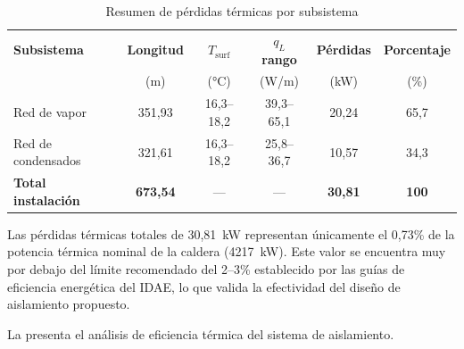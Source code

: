 \begin{table}[H]
	\centering
	\caption{Resumen de pérdidas térmicas por subsistema}
	\label{tab:conclusiones-perdidas-termicas}
	\begin{tabular}{lccccc}
		\toprule
		\textbf{Subsistema}        & \textbf{Longitud} & \textbf{$T_{\text{surf}}$} & \textbf{$q_L$ rango} & \textbf{Pérdidas} & \textbf{Porcentaje} \\
		                           & (m)               & (°C)                       & (W/m)                & (kW)              & (\%)                \\
		\midrule
		Red de vapor               & 351,93            & 16,3--18,2                 & 39,3--65,1           & 20,24             & 65,7                \\
		Red de condensados         & 321,61            & 16,3--18,2                 & 25,8--36,7           & 10,57             & 34,3                \\
		\midrule
		\textbf{Total instalación} & \textbf{673,54}   & ---                        & ---                  & \textbf{30,81}    & \textbf{100}        \\
		\bottomrule
	\end{tabular}
\end{table}

Las pérdidas térmicas totales de 30,81~kW representan únicamente el 0,73\% de la potencia térmica nominal de la caldera (4217~kW). Este valor se encuentra muy por debajo del límite recomendado del 2--3\% establecido por las guías de eficiencia energética del IDAE, lo que valida la efectividad del diseño de aislamiento propuesto.

La  presenta el análisis de eficiencia térmica del sistema de aislamiento.

